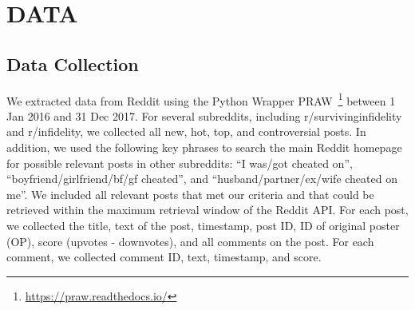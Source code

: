 \section{DATA}
\subsection{Data Collection}

We extracted data from Reddit using the Python Wrapper PRAW~\footnote{\url{https://praw.readthedocs.io/}} between 1 Jan 2016 and 31 Dec 2017. For several subreddits, including r/survivinginfidelity and r/infidelity, we collected all new, hot, top, and controversial posts. In addition, we used the following key phrases to search the main Reddit homepage for possible relevant posts in other subreddits: ``I was/got cheated on'', ``boyfriend/girlfriend/bf/gf cheated'', and ``husband/partner/ex/wife cheated on me''. We included all relevant posts that met our criteria and that could be retrieved within the maximum retrieval window of the Reddit API.
For each post, we collected the title, text of the post, timestamp, post ID, ID of original poster (OP), score (upvotes - downvotes), and all comments on the post. For each comment, we collected comment ID, text, timestamp, and score.  





